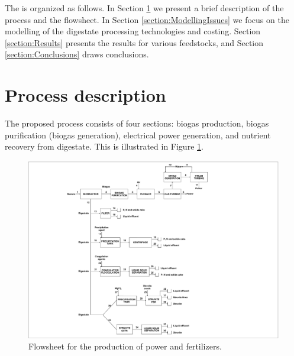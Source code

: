 \begin{refsection}[referencesCh2]
The {\color{red}{section}} is organized as follows. In Section \ref{section:ProcessDescription} we present a brief description of the process and the flowsheet. In Section \ref{section:ModellingIssues} we focus on the modelling of the digestate processing technologies and costing. Section \ref{section:Results} presents the results for various feedstocks, and Section \ref{section:Conclusions} draws conclusions.

\section{Process description} \label{section:ProcessDescription}
The proposed process consists of four sections: biogas production, biogas purification (biogas generation), electrical power generation, and nutrient recovery from digestate. This is illustrated in Figure \ref{fig:Flowsheet}.

\begin{figure}[h]
	\centering
	\includegraphics[width=1\linewidth, trim={6.5cm 0.1cm 11.5cm 0.3cm},clip]{gfx/Chapter2/superstructure3bloquesCOMPATIBILIDAD-Layout3.pdf} 
	\caption{Flowsheet for the production of power and fertilizers.}
	\label{fig:Flowsheet}
\end{figure}


\end{refsection}
